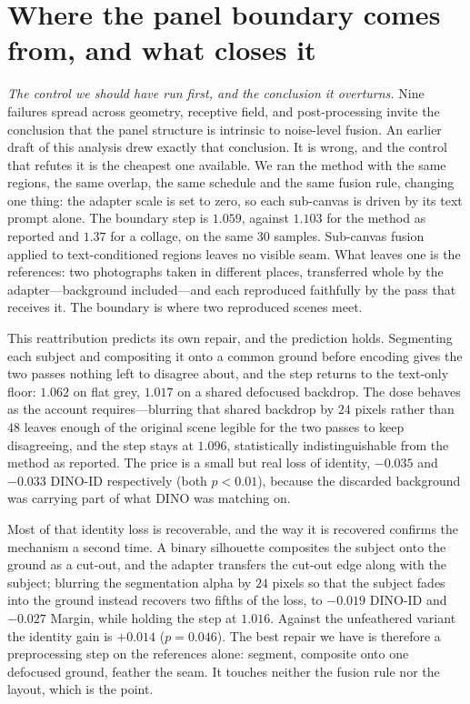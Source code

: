 \documentclass[review,10pt,times]{elsarticle}
\begin{document}

\section{Where the panel boundary comes from, and what closes it}
\noindent\textit{The control we should have run first, and the conclusion it
overturns.}
Nine failures spread across geometry, receptive field, and post-processing
invite the conclusion that the panel structure is intrinsic to noise-level
fusion.  An earlier draft of this analysis drew exactly that conclusion.  It
is wrong, and the control that refutes it is the cheapest one available.  We
ran the method with the same regions, the same overlap, the same schedule and
the same fusion rule, changing one thing: the adapter scale is set to zero, so
each sub-canvas is driven by its text prompt alone.  The boundary step is
$1.059$, against $1.103$ for the method as reported and $1.37$ for a collage,
on the same 30 samples.  Sub-canvas fusion applied to text-conditioned regions
leaves no visible seam.  What leaves one is the references: two photographs
taken in different places, transferred whole by the adapter---background
included---and each reproduced faithfully by the pass that receives it.  The
boundary is where two reproduced scenes meet.

This reattribution predicts its own repair, and the prediction holds.
Segmenting each subject and compositing it onto a common ground before
encoding gives the two passes nothing left to disagree about, and the step
returns to the text-only floor: $1.062$ on flat grey, $1.017$ on a shared
defocused backdrop.  The dose behaves as the account requires---blurring that
shared backdrop by $24$ pixels rather than $48$ leaves enough of the original
scene legible for the two passes to keep disagreeing, and the step stays at
$1.096$, statistically indistinguishable from the method as reported.  The
price is a small but real loss of identity, $-0.035$ and $-0.033$ DINO-ID
respectively (both $p{<}0.01$), because the discarded background was carrying
part of what DINO was matching on.

Most of that identity loss is recoverable, and the way it is recovered
confirms the mechanism a second time.  A binary silhouette composites the
subject onto the ground as a cut-out, and the adapter transfers the cut-out
edge along with the subject; blurring the segmentation alpha by $24$ pixels so
that the subject fades into the ground instead recovers two fifths of the
loss, to $-0.019$ DINO-ID and $-0.027$ Margin, while holding the step at
$1.016$.  Against the unfeathered variant the identity gain is $+0.014$
($p{=}0.046$).  The best repair we have is therefore a preprocessing step on
the references alone: segment, composite onto one defocused ground, feather
the seam.  It touches neither the fusion rule nor the layout, which is the
point.
\end{document}
